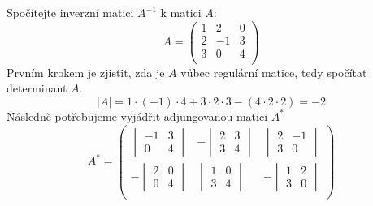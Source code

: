\begin{example}
    Spočítejte inverzní matici $A^{-1}$ k matici $A$:
    \[A =
        \begin{pmatrix}
            1 & 2 & 0\\
            2 & -1 & 3 \\
            3 & 0 & 4 \\
        \end{pmatrix}
    \]
    Prvním krokem je zjistit, zda je $A$ vůbec regulární matice, tedy spočítat determinant $A$.
    $$|A| = 1 \cdot (-1) \cdot 4 + 3 \cdot 2 \cdot 3 - (4 \cdot 2 \cdot 2) = -2$$
    Následně potřebujeme vyjádřit adjungovanou matici $A^*$
    \[A^*=
        \begin{pmatrix}
            \begin{vmatrix}
                -1 & 3 \\
                0 & 4
            \end{vmatrix} &
            - \begin{vmatrix}
                2 & 3 \\
                3 & 4
            \end{vmatrix} &
            \begin{vmatrix}
                2 & -1 \\
                3 & 0
            \end{vmatrix} \\

            - \begin{vmatrix}
                2 & 0 \\
                0 & 4
            \end{vmatrix} &
            \begin{vmatrix}
                1 & 0 \\
                3 & 4
            \end{vmatrix} &
            - \begin{vmatrix}
                1 & 2 \\
                3 & 0
            \end{vmatrix} \\


\end{pmatrix}\]
\end{example}
